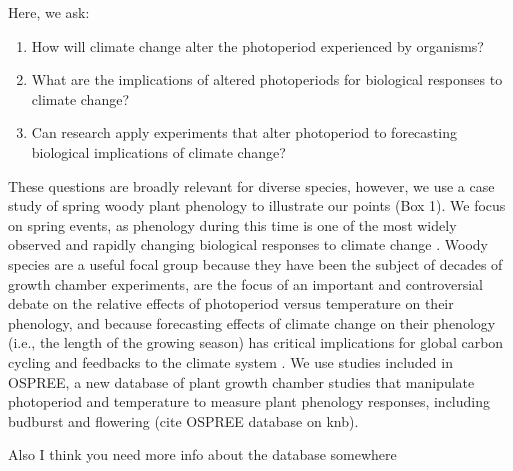 \documentclass{article}
\begin{document}
\par Here, we ask: 
\begin{enumerate}
\item How will climate change alter the photoperiod experienced by organisms? 
\item What are the implications of altered photoperiods for biological responses to climate change?
\item Can research apply experiments that alter photoperiod to forecasting biological implications of climate change?

\end{enumerate}
\par These questions are broadly relevant for diverse species, however, we use a case study of spring woody plant phenology to illustrate our points (Box 1). We focus on spring events, as phenology during this time is one of the most widely observed and rapidly changing biological responses to climate change \citep{parmesan2006}. Woody species are a useful focal group because they have been the subject of decades of growth chamber experiments, are the focus of an important and controversial debate on the relative effects of photoperiod versus temperature on their phenology, and because forecasting effects of climate change on their phenology (i.e., the length of the growing season) has critical implications for global carbon cycling and feedbacks to the climate system \citep{richardson2013}. We use studies included in OSPREE, a new database of plant growth chamber studies that manipulate photoperiod and temperature to measure plant phenology responses, including budburst and flowering (cite OSPREE database on knb).%

Also I think you need more info about the database somewhere
\end{document}
